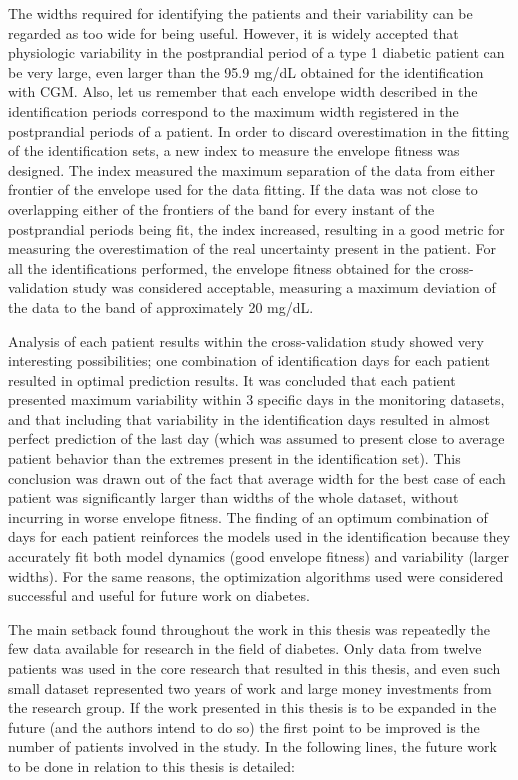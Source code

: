 The widths required for identifying the patients and their variability can be regarded as too wide for being useful. However, it is widely accepted that physiologic variability in the postprandial period of a type 1 diabetic patient can be very large, even larger than the 95.9 mg/dL obtained for the identification with CGM. Also, let us remember that each envelope width described in the identification periods correspond to the maximum width registered in the postprandial periods of a patient. In order to discard overestimation in the fitting of the identification sets, a new index to measure the envelope fitness was designed. The index measured the maximum separation of the data from either frontier of the envelope used for the data fitting. If the data was not close to overlapping either of the frontiers of the band for every instant of the postprandial periods being fit, the index increased, resulting in a good metric for measuring the overestimation of the real uncertainty present in the patient. For all the identifications performed, the envelope fitness obtained for the cross-validation study was considered acceptable, measuring a maximum deviation of the data to the band of approximately 20 mg/dL.

Analysis of each patient results within the cross-validation study showed very interesting possibilities; one combination of identification days for each patient resulted in optimal prediction results. It was concluded that each patient presented maximum variability within 3 specific days in the monitoring datasets, and that including that variability in the identification days resulted in almost perfect prediction of the last day (which was assumed to present close to average patient behavior than the extremes present in the identification set). This conclusion was drawn out of the fact that average width for the best case of each patient was significantly larger than widths of the whole dataset, without incurring in worse envelope fitness. The finding of an optimum combination of days for each patient reinforces the models used in the identification because they accurately fit both model dynamics (good envelope fitness) and variability (larger widths). For the same reasons, the optimization algorithms used were considered successful and useful for future work on diabetes. 

The main setback found throughout the work in this thesis was repeatedly the few data available for research in the field of diabetes. Only data from twelve patients was used in the core research that resulted in this thesis, and even such small dataset represented two years of work and large money investments from the research group. If the work presented in this thesis is to be expanded in the future (and the authors intend to do so) the first point to be improved is the number of patients involved in the study. In the following lines, the future work to be done in relation to this thesis is detailed:

